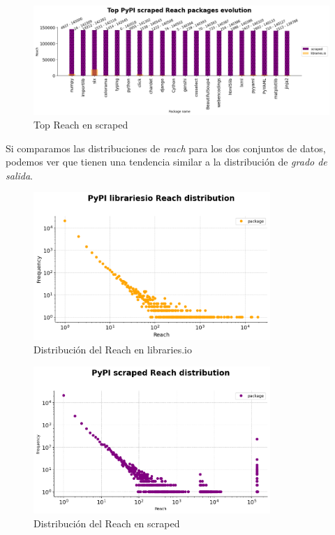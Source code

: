\begin{figure}[h!]
    \begin{center}
        \includegraphics[width=1.2\textwidth]{img/pypi/top_scraped_reach_evolution.png}
        \caption{Top Reach en scraped}
    \end{center}
\end{figure}


Si comparamos las distribuciones de \textit{reach} para los dos conjuntos de datos, podemos ver que tienen una
tendencia similar a la distribución de \textit{grado de salida}.

\begin{figure}[h!]
    \begin{center}
        \includegraphics[width=0.8\textwidth]{img/pypi/librariesio_reach_distribution.png}
        \caption{Distribución del Reach en libraries.io}
    \end{center}
\end{figure}

\begin{figure}[h!]
    \begin{center}
        \includegraphics[width=0.8\textwidth]{img/pypi/scraped_reach_distribution.png}
        \caption{Distribución del Reach en scraped}
    \end{center}
\end{figure}

